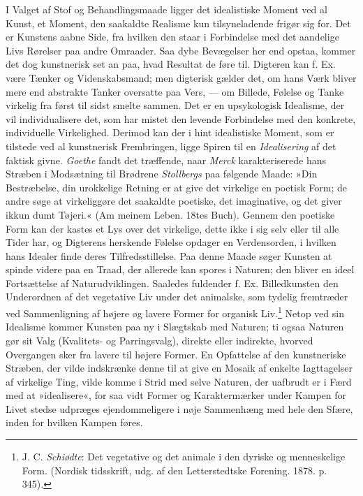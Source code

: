 \documentclass[12pt,a4paper,openany]{book}
\newcommand{\opage}[1]{\marginnote{\footnotesize\textit{[#1]}}}
\begin{document}
I Valget af Stof og Behandlingsmaade ligger det idealistiske Moment ved
al Kunst, et Moment, den saakaldte Realisme kun tilsyneladende frigør
sig for. Det er Kunstens aabne Side, fra hvilken den staar i Forbindelse
med det aandelige Livs Rørelser paa andre Omraader. Saa dybe Bevægelser
her end opstaa, kommer det dog kunstnerisk set an paa, hvad Resultat de
føre til. Digteren kan f. Ex. være Tænker og Videnskabsmand; men
digterisk gælder det, om hans Værk bliver mere end abstrakte Tanker
oversatte paa Vers, --- om Billede, Følelse og Tanke virkelig fra først
til sidst smelte sammen. Det er
\opage{226}en upsykologisk Idealisme, der vil individualisere det, som
har mistet den levende Forbindelse med den konkrete, individuelle
Virkelighed. Derimod kan der i hint idealistiske Moment, som er tilstede
ved al kunstnerisk Frembringen, ligge Spiren til en \emph{Idealisering}
af det faktisk givne. \emph{Goethe} fandt det træffende, naar
\emph{Merck} karakteriserede hans Stræben i Modsætning til Brødrene
\emph{Stollbergs} paa følgende Maade: »Din Bestræbelse, din urokkelige
Retning er at give det virkelige en poetisk Form; de andre søge at
virkeliggøre det saakaldte poetiske, det imaginative, og det giver ikkun
dumt Tøjeri.« (Am meinem Leben. 18tes Buch). Gennem den poetiske Form
kan der kastes et Lys over det virkelige, dette ikke i sig selv eller
til alle Tider har, og Digterens herskende Følelse opdager en
Verdensorden, i hvilken hans Idealer finde deres Tilfredsstillelse. Paa
denne Maade søger Kunsten at spinde videre paa en Traad, der allerede
kan spores i Naturen; den bliver en ideel Fortsættelse af
Naturudviklingen. Saaledes fuldender f. Ex. Billedkunsten den
Underordnen af det vegetative Liv under det animalske, som tydelig
fremtræder ved Sammenligning af højere øg lavere Former for organisk
Liv.\footnote[1]{J. C. \emph{Schiødte}: Det vegetative og det animale i
den dyriske og menneskelige Form. (Nordisk tidsskrift, udg. af den
Letterstedtske Forening. 1878. p. 345).} Netop ved sin Idealisme kommer
Kunsten paa ny i Slægtskab med Naturen; ti ogsaa Naturen gør sit Valg
(Kvalitets- og Parringsvalg), direkte eller indirekte, hvorved
Overgangen sker fra lavere til højere Former. En Opfattelse af den
kunstneriske Stræben, der vilde indskrænke denne til at give en Mosaik
af enkelte Iagttagelser af virkelige Ting, vilde komme i Strid med selve
Naturen, der uafbrudt er i Færd med at »idealisere«, for saa vidt Former
og Karaktermærker under Kampen for Livet stedse udpræges ejendommeligere
i nøje Sammenhæng med hele den Sfære, inden for hvilken Kampen føres.
\end{document}

